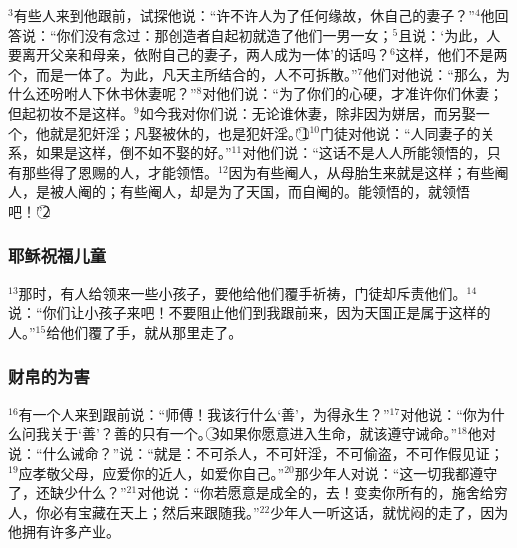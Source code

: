 $^{3}$有些\UL[法利塞]人来到他跟前，试探他说：“许不许人为了任何缘故，休自己的妻子？”$^{4}$他回答说：“你们没有念过：那创造者自起初就造了他们一男一女；$^{5}$且说：‘为此，人要离开父亲和母亲，依附自己的妻子，两人成为一体’的话吗？$^{6}$这样，他们不是两个，而是一体了。为此，凡天主所结合的，人不可拆散。”$^{7}$他们对他说：“那么，为什么\UL[梅瑟]还吩咐人下休书休妻呢？”$^{8}$\UL[耶稣]对他们说：“\UL[梅瑟]为了你们的心硬，才准许你们休妻；但起初妆不是这样。$^{9}$如今我对你们说：无论谁休妻，除非因为姘居，而另娶一个，他就是犯奸淫；凡娶被休的，也是犯奸淫。”\textcircled{1}$^{10}$门徒对他说：“人同妻子的关系，如果是这样，倒不如不娶的好。”$^{11}$\UL[耶稣]对他们说：“这话不是人人所能领悟的，只有那些得了恩赐的人，才能领悟。$^{12}$因为有些阉人，从母胎生来就是这样；有些阉人，是被人阉的；有些阉人，却是为了天国，而自阉的。能领悟的，就领悟吧！”\textcircled{2}


\subsubsection{耶稣祝福儿童}
$^{13}$那时，有人给\UL[耶稣]领来一些小孩子，要他给他们覆手祈祷，门徒却斥责他们。$^{14}$\UL[耶稣]说：“你们让小孩子来吧！不要阻止他们到我跟前来，因为天国正是属于这样的人。”$^{15}$\UL[耶稣]给他们覆了手，就从那里走了。


\subsubsection{财帛的为害}
$^{16}$有一个人来到\UL[耶稣]跟前说：“师傅！我该行什么‘善’，为得永生？”$^{17}$\UL[耶稣]对他说：“你为什么问我关于‘善’？善的只有一个。\textcircled{3}如果你愿意进入生命，就该遵守诫命。”$^{18}$他对\UL[耶稣]说：“什么诫命？”\UL[耶稣]说：“就是：不可杀人，不可奸淫，不可偷盗，不可作假见证；$^{19}$应孝敬父母，应爱你的近人，如爱你自己。”$^{20}$那少年人对\UL[耶稣]说：“这一切我都遵守了，还缺少什么？”$^{21}$\UL[耶稣]对他说：“你若愿意是成全的，去！变卖你所有的，施舍给穷人，你必有宝藏在天上；然后来跟随我。”$^{22}$少年人一听这话，就忧闷的走了，因为他拥有许多产业。

